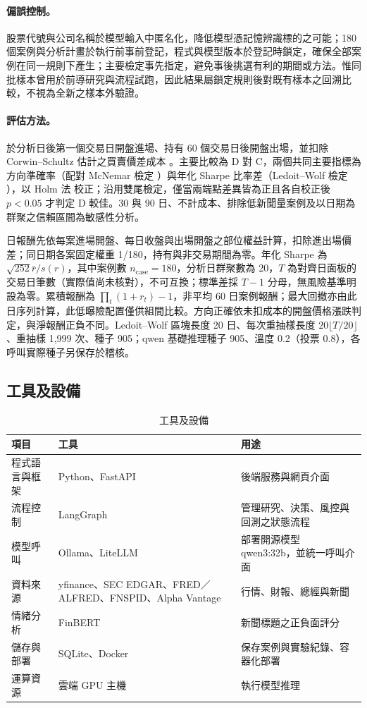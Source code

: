 \documentclass[12pt,a4paper]{article}
\newcommand{\grp}[1]{\textsf{#1}}
\begin{document}
\begin{CJK}{UTF8}{bkai}
\paragraph{偏誤控制。} 股票代號與公司名稱於模型輸入中匿名化，降低模型憑記憶辨識標的之可能；180 個案例與分析計畫於執行前事前登記，程式與模型版本於登記時鎖定，確保全部案例在同一規則下產生；主要檢定事先指定，避免事後挑選有利的期間或方法。惟同批樣本曾用於前導研究與流程試跑，因此結果屬鎖定規則後對既有樣本之回溯比較，不視為全新之樣本外驗證。

\paragraph{評估方法。} 於分析日後第一個交易日開盤進場、持有 60 個交易日後開盤出場，並扣除 Corwin--Schultz 估計之買賣價差成本 \citep{corwin2012spread}。主要比較為 \grp{D} 對 \grp{C}，兩個共同主要指標為方向準確率（配對 McNemar 檢定 \citep{mcnemar1947}）與年化 Sharpe 比率差（Ledoit--Wolf 檢定 \citep{ledoit2008sharpe}），以 Holm 法 \citep{holm1979} 校正；沿用雙尾檢定，僅當兩端點差異皆為正且各自校正後 $p<0.05$ 才判定 \grp{D} 較佳。30 與 90 日、不計成本、排除低新聞量案例及以日期為群聚之信賴區間為敏感性分析。

日報酬先依每案進場開盤、每日收盤與出場開盤之部位權益計算，扣除進出場價差；同日期各案固定權重 1/180，持有與非交易期間為零。年化 Sharpe 為 $\sqrt{252}\bar r/s(r)$，其中案例數 $n_{\mathrm{case}}=180$，分析日群聚數為 20，$T$ 為對齊日面板的交易日筆數（實際值尚未核對），不可互換；標準差採 $T-1$ 分母，無風險基準明設為零。累積報酬為 $\prod_t(1+r_t)-1$，非平均 60 日案例報酬；最大回撤亦由此日序列計算，此低曝險配置僅供組間比較。方向正確依未扣成本的開盤價格漲跌判定，與淨報酬正負不同。Ledoit--Wolf 區塊長度 20 日、每次重抽樣長度 $20\lfloor T/20\rfloor$、重抽樣 1,999 次、種子 905；qwen 基礎推理種子 905、溫度 0.2（投票 0.8），各呼叫實際種子另保存於稽核。


\subsection{工具及設備}

\begin{table}[H]
\centering\small
\caption{工具及設備}
\label{tab:tools}
\begin{tabularx}{\textwidth}{@{}l Y Y@{}}
\toprule
項目 & 工具 & 用途 \\
\midrule
程式語言與框架 & Python、FastAPI & 後端服務與網頁介面 \\
流程控制 & LangGraph & 管理研究、決策、風控與回測之狀態流程 \\
模型呼叫 & Ollama、LiteLLM & 部署開源模型 qwen3:32b，並統一呼叫介面 \\
資料來源 & yfinance、\allowbreak SEC EDGAR、\allowbreak FRED／ALFRED、\allowbreak FNSPID、\allowbreak Alpha Vantage &行情、財報、總經與新聞 \\
情緒分析 & FinBERT & 新聞標題之正負面評分 \\
儲存與部署 & SQLite、Docker & 保存案例與實驗紀錄、容器化部署 \\
運算資源 & 雲端 GPU 主機 & 執行模型推理 \\
\bottomrule
\end{tabularx}
\end{table}


\end{CJK}
\end{document}
